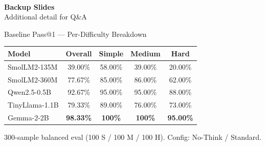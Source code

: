 \documentclass[10pt, aspectratio=169]{beamer}
\begin{document}
\appendix

{
  \begin{frame}[plain]
    \vfill
    \begin{center}
      {\Huge\color{sky}\faFolderOpen}\\[0.8em]
      {\LARGE\bfseries\color{textprimary}Backup Slides}\\[0.4em]
      {\small\color{textsecondary}Additional detail for Q\&A}
    \end{center}
    \vfill
  \end{frame}
}

\begin{frame}{Baseline Pass@1 — Per-Difficulty Breakdown}
  \centering
  \begin{tcolorbox}
  \centering
  \footnotesize
  \renewcommand{\arraystretch}{1.6}
  \setlength\tabcolsep{10pt}
  \begin{tabular}{@{}lcccc@{}}
    \rowcolor{cardbg}
    \textbf{Model} & \textbf{Overall} & \textbf{Simple} & \textbf{Medium} & \textbf{Hard} \\
    \midrule
    SmolLM2-135M   & 39.00\% & 58.00\% & 39.00\% & \textcolor{warn}{20.00\%} \\
    SmolLM2-360M   & 77.67\% & 85.00\% & 86.00\% & 62.00\% \\
    Qwen2.5-0.5B   & 92.67\% & 95.00\% & 95.00\% & 88.00\% \\
    TinyLlama-1.1B & 79.33\% & 89.00\% & 76.00\% & 73.00\% \\
    Gemma-2-2B     & \textbf{98.33\%} & \textbf{100\%} & \textbf{100\%} & \textbf{95.00\%} \\
  \end{tabular}
  \end{tcolorbox}

  \vspace{0.6em}
  {\scriptsize\color{slate} 300-sample balanced eval (100 S / 100 M / 100 H). Config: No-Think / Standard.}
\end{frame}
\end{document}
